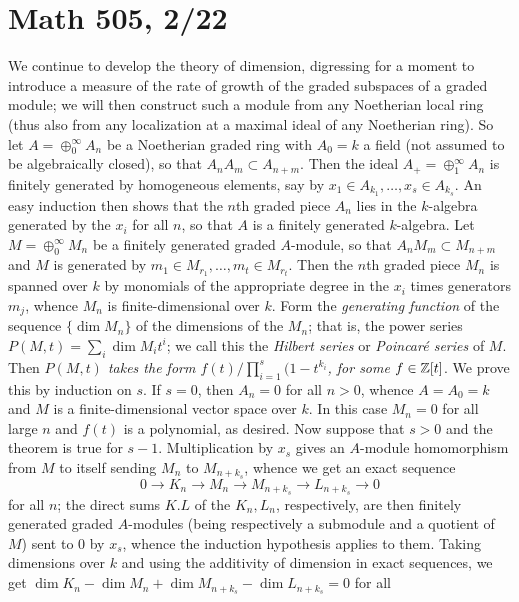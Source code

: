 \documentclass[10pt]{article}
\begin{document}
\section*{Math 505, 2/22}

We continue to develop the theory of dimension, digressing for a moment
to introduce a measure of the rate of growth of the graded subspaces of
a graded module; we will then construct such a module from any
Noetherian local ring (thus also from any localization at a maximal
ideal of any Noetherian ring). So let $A=\oplus_0^\infty A_n$ be a
Noetherian graded ring with $A_0 = k$ a field (not assumed to be
algebraically closed), so that $A_n A_m\subset A_{n+m}$. Then the ideal
$A_+ = \oplus_1^\infty A_n$ is finitely generated by homogeneous
elements, say by $x_1\in A_{k_1},\ldots,x_s\in A_{k_s}$. An easy
induction then shows that the $n$th graded piece $A_n$ lies in the
$k$-algebra generated by the $x_i$ for all $n$, so that $A$ is a
finitely generated $k$-algebra. Let $M = \oplus_0^\infty M_n$ be a
finitely generated graded $A$-module, so that $A_n M_m\subset M_{n+m}$
and $M$ is generated by $m_1\in M_{r_1},\ldots,m_t\in M_{r_t}$. Then the
$n$th graded piece $M_n$ is spanned over $k$ by monomials of the
appropriate degree in the $x_i$ times generators $m_j$, whence $M_n$ is
finite-dimensional over $k$. Form the {\sl generating function} of the
sequence $\{\dim M_n\}$ of the dimensions of the $M_n$; that is, the
power series $P(M,t) = \sum_i \dim M_i t^i$; we call this the {\sl
  Hilbert series} or {\sl Poincar\'e series} of $M$. Then {\sl $P(M,t)$
  takes the form $f(t)/\prod_{i=1}^s (1-t^{k_i}$, for some $f\in\Bbb
  Z[t]$}. We prove this by induction on $s$. If $s=0$, then $A_n = 0$
for all $n>0$, whence $A= A_0 = k$ and $M$ is a finite-dimensional
vector space over $k$. In this case $M_n = 0$ for all large $n$ and
$f(t)$ is a polynomial, as desired. Now suppose that $s>0$ and the
theorem is true for $s-1$. Multiplication by $x_s$ gives an $A$-module
homomorphism from $M$ to itself sending $M_n$ to $M_{n+k_s}$, whence we
get an exact sequence
$$0\rightarrow K_n\rightarrow M_n\rightarrow M_{n+k_s}\rightarrow L_{n+k_s}\rightarrow 0$$
\noindent for all $n$; the direct sums $K.L$ of the $K_n,L_n$,
respectively, are then finitely generated graded $A$-modules (being
respectively a submodule and a quotient of $M$) sent to 0 by $x_s$,
whence the induction hypothesis applies to them. Taking dimensions over
$k$ and using the additivity of dimension in exact sequences, we get
$\dim K_n - \dim M_n + \dim M_{n+k_s} - \dim L_{n+k_s} = 0$ for all
\end{document}
